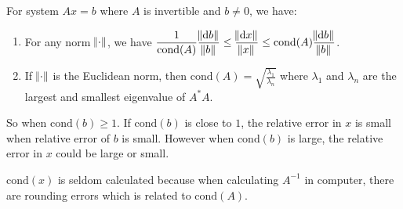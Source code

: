 \begin{theorem}
    For system $Ax=b$ where $A$ is invertible and $b \neq 0$, we have:
    \begin{enumerate}
        \item For any norm $\norm{\cdot}$, we have $\displaystyle \frac{1}{\text{cond}(A)} \frac{\norm{\dif b}}{\norm{b}} \leq \frac{\norm{\dif x}}{\norm{x}} \leq \text{cond}(A) \frac{\norm{\dif b}}{\norm{b}}$.
        \item If $\norm{\cdot}$ is the Euclidean norm, then $\displaystyle \text{cond}(A) = \sqrt{\frac{\lambda_1}{\lambda_n}}$ where $\lambda_1$ and $\lambda_n$ are the largest and smallest eigenvalue of $A^*A$.
    \end{enumerate}
    
    So when $\text{cond} (b) \geq 1$. If $\text{cond}(b)$ is close to $1$, the relative error in $x$ is small when relative error of $b$ is small. However when $\text{cond}(b)$ is large, the relative error in $x$ could be large or small. 
    
    $\text{cond}(x)$ is seldom calculated because when calculating $A^{-1}$ in computer, there are rounding errors which is related to $\text{cond}(A)$.
\end{theorem}


